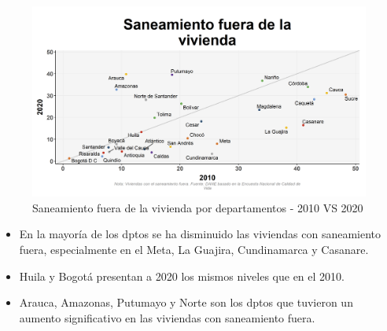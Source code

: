     \begin{figure}[H]
        \caption{Saneamiento fuera de la vivienda por departamentos - 2010 VS 2020 \label{map_result_2} }
        \begin{center}
        \includegraphics[width=\textwidth,keepaspectratio]{img/var_195_scatter_time.png}
        \end{center}
    \end{figure}
            \begin{itemize}
                    \item En la mayoría de los dptos se ha disminuido las viviendas con saneamiento fuera, especialmente en el Meta, La Guajira, Cundinamarca y Casanare.
                    \item Huila y Bogotá presentan a 2020 los mismos niveles que en el 2010.
                    \item Arauca, Amazonas, Putumayo y Norte son los dptos que tuvieron un aumento significativo en las viviendas con saneamiento fuera.
                    \end{itemize}

